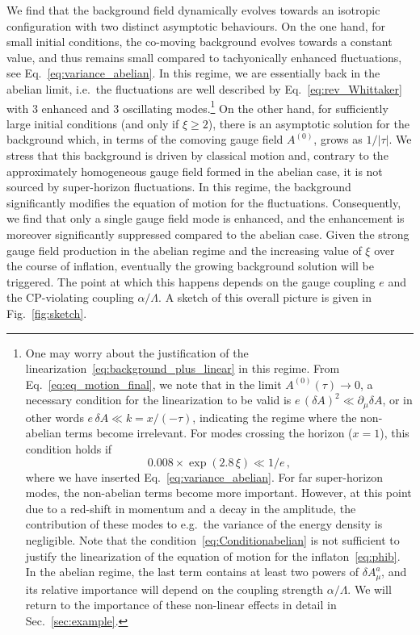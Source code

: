  We find that the background field dynamically evolves towards an isotropic configuration with two distinct asymptotic behaviours. On the one hand, for small initial conditions, the co-moving background evolves towards a constant value, and thus remains small compared to tachyonically enhanced fluctuations, see Eq.~\eqref{eq:variance_abelian}. 
 In this regime, we are essentially back in the abelian limit, i.e.\ the fluctuations are well described by Eq.~\eqref{eq:rev_Whittaker} with 3 enhanced  and 3 oscillating modes.\footnote{ One may worry about the justification of the linearization~\eqref{eq:background_plus_linear} in this regime. From Eq.~\eqref{eq:eq_motion_final}, we note that in the limit $A^{(0)}(\tau) \rightarrow 0$, a necessary condition for the linearization to be valid is $e \, (\delta A)^2  \ll \partial_\mu \delta A$, or in other words $ e \, \delta A \ll k = x/(- \tau)$, indicating the regime where the non-abelian terms become irrelevant. For modes crossing the horizon  ($x = 1$), this condition holds if
 \begin{equation}
  0.008 \times \exp(2.8 \, \xi) \ll 1/e \,,
  \label{eq:Conditionabelian}
 \end{equation}
where we have inserted Eq.~\eqref{eq:variance_abelian}. For far super-horizon modes, the non-abelian terms become more important. However, at this point due to a red-shift in momentum and a decay in the amplitude, the contribution of these modes to e.g.\ the variance of the energy density is negligible. Note that the condition~\eqref{eq:Conditionabelian} is not sufficient to justify the linearization of the equation of motion for the inflaton~\eqref{eq:phib}. In the abelian regime, the last term contains at least two powers of $\delta A_\mu^a$, and its relative importance will depend on the coupling strength $\alpha/\Lambda$. We will return to the importance of these non-linear effects in detail in Sec.~\ref{sec:example}.} On the other hand, for sufficiently large initial conditions (and only if $\xi \geq 2$), there is an asymptotic solution for the background which, in terms of the comoving gauge field $A^{(0)}$, grows as $1/|\tau|$. 
We stress that this background is driven by classical motion and, contrary to the approximately homogeneous gauge field formed in the abelian case, it is not sourced by super-horizon fluctuations. In this regime, the background significantly modifies the equation of motion for the fluctuations. Consequently, we find that only a single gauge field mode is enhanced, and the enhancement is moreover significantly suppressed compared to the abelian case. Given the strong gauge field production in the abelian regime and the increasing value of $\xi$ over the course of inflation, eventually the growing background solution will be triggered. The point at which this happens depends on the gauge coupling $e$ and the CP-violating coupling $\alpha/\Lambda$. A sketch of this overall picture is given in Fig.~\ref{fig:sketch}. 